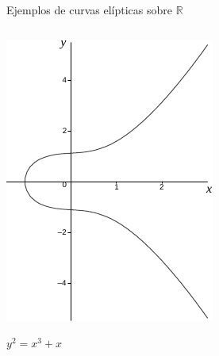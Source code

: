 \documentclass[aspectratio=43,10pt,spanish]{beamer}
\theoremstyle{definition} %
\begin{document}
\begin{frame}{Ejemplos de curvas elípticas sobre $\mathbb{R}$}
\begin{columns}[T,onlytextwidth]
            \begin{center}
                \includegraphics[width=.9\linewidth]{Graficos/grafo_curva_eliptica_reales_2.pdf}

                $y^2 = x^3 + x$
            \end{center}
        \end{columns}
\end{frame}
\end{document}
